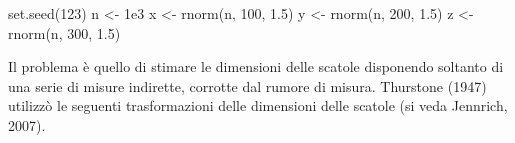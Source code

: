\documentclass[
  11pt,
]{krantz}
\makeatletter
\newenvironment{Shaded}{\begin{snugshade}}{\end{snugshade}}
\newcommand{\DecValTok}[1]{\textcolor[rgb]{0.06,0.06,0.06}{#1}}
\newcommand{\FloatTok}[1]{\textcolor[rgb]{0.06,0.06,0.06}{#1}}
\newcommand{\FunctionTok}[1]{\textcolor[rgb]{0,0,0}{#1}}
\newcommand{\NormalTok}[1]{#1}
\newcommand{\OtherTok}[1]{\textcolor[rgb]{0.37,0.37,0.37}{#1}}
\newenvironment{kframe}{%
\medskip{}
\setlength{\fboxsep}{.8em}
 \def\at@end@of@kframe{}%
 \ifinner\ifhmode%
  \def\at@end@of@kframe{\end{minipage}}%
  \begin{minipage}{\columnwidth}%
 \fi\fi%
 \def\FrameCommand##1{\hskip\@totalleftmargin \hskip-\fboxsep
 \colorbox{shadecolor}{##1}\hskip-\fboxsep
     \hskip-\linewidth \hskip-\@totalleftmargin \hskip\columnwidth}%
 \MakeFramed {\advance\hsize-\width
   \@totalleftmargin\z@ \linewidth\hsize
   \@setminipage}}%
 {\par\unskip\endMakeFramed%
 \at@end@of@kframe}
\renewenvironment{Shaded}{\begin{kframe}}{\end{kframe}}
\makeatother
\begin{document}
\begin{Shaded}
\begin{Highlighting}[]
\FunctionTok{set.seed}\NormalTok{(}\DecValTok{123}\NormalTok{)}
\NormalTok{n }\OtherTok{\textless{}{-}} \FloatTok{1e3}
\NormalTok{x }\OtherTok{\textless{}{-}} \FunctionTok{rnorm}\NormalTok{(n, }\DecValTok{100}\NormalTok{, }\FloatTok{1.5}\NormalTok{)}
\NormalTok{y }\OtherTok{\textless{}{-}} \FunctionTok{rnorm}\NormalTok{(n, }\DecValTok{200}\NormalTok{, }\FloatTok{1.5}\NormalTok{)}
\NormalTok{z }\OtherTok{\textless{}{-}} \FunctionTok{rnorm}\NormalTok{(n, }\DecValTok{300}\NormalTok{, }\FloatTok{1.5}\NormalTok{)}
\end{Highlighting}
\end{Shaded}

Il problema è quello di stimare le dimensioni delle scatole disponendo soltanto di una serie di misure indirette, corrotte dal rumore di misura. Thurstone (1947) utilizzò le seguenti trasformazioni delle dimensioni delle scatole (si veda Jennrich, 2007).
\end{document}
